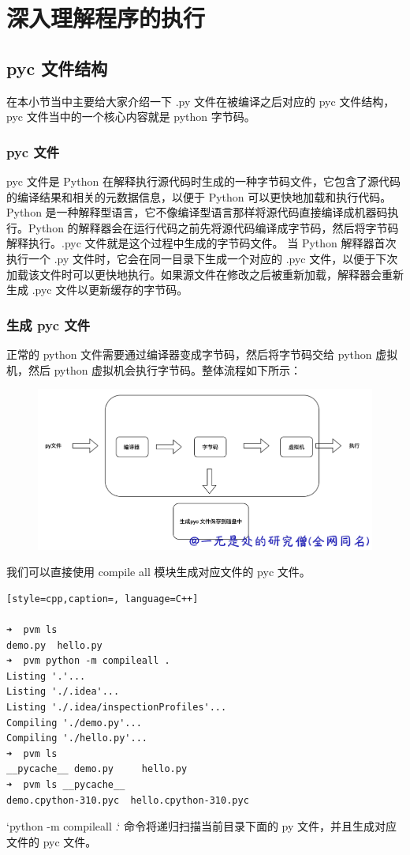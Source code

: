 \chapter{深入理解程序的执行}
\section{pyc 文件结构}
在本小节当中主要给大家介绍一下 .py 文件在被编译之后对应的 pyc 文件结构，pyc 文件当中的一个核心内容就是 python 字节码。
\subsection{pyc 文件}
pyc 文件是 Python 在解释执行源代码时生成的一种字节码文件，它包含了源代码的编译结果和相关的元数据信息，以便于 Python 可以更快地加载和执行代码。
Python 是一种解释型语言，它不像编译型语言那样将源代码直接编译成机器码执行。Python 的解释器会在运行代码之前先将源代码编译成字节码，然后将字节码解释执行。.pyc 文件就是这个过程中生成的字节码文件。
当 Python 解释器首次执行一个 .py 文件时，它会在同一目录下生成一个对应的 .pyc 文件，以便于下次加载该文件时可以更快地执行。如果源文件在修改之后被重新加载，解释器会重新生成 .pyc 文件以更新缓存的字节码。
\subsection{生成 pyc 文件}
正常的 python 文件需要通过编译器变成字节码，然后将字节码交给 python 虚拟机，然后 python 虚拟机会执行字节码。整体流程如下所示：

    \begin{figure}[h]
        \centering
            \includegraphics[scale=.25]{images/35-pyc.png}
						\caption{ }
        \label{fig:my_label}
    \end{figure}
    
我们可以直接使用 compile all 模块生成对应文件的 pyc 文件。
\begin{lstlisting}[style=cpp,caption=, language=C++]

➜  pvm ls
demo.py  hello.py
➜  pvm python -m compileall .
Listing '.'...
Listing './.idea'...
Listing './.idea/inspectionProfiles'...
Compiling './demo.py'...
Compiling './hello.py'...
➜  pvm ls
__pycache__ demo.py     hello.py
➜  pvm ls __pycache__ 
demo.cpython-310.pyc  hello.cpython-310.pyc
\end{lstlisting}
`python -m compileall .` 命令将递归扫描当前目录下面的 py 文件，并且生成对应文件的 pyc 文件。
